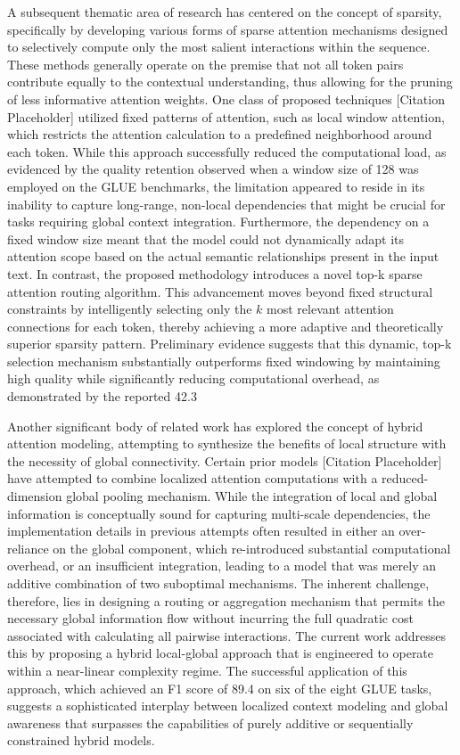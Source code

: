 \documentclass[12pt]{article}
\begin{document}
A subsequent thematic area of research has centered on the concept of sparsity, specifically by developing various forms of sparse attention mechanisms designed to selectively compute only the most salient interactions within the sequence. These methods generally operate on the premise that not all token pairs contribute equally to the contextual understanding, thus allowing for the pruning of less informative attention weights. One class of proposed techniques [Citation Placeholder] utilized fixed patterns of attention, such as local window attention, which restricts the attention calculation to a predefined neighborhood around each token. While this approach successfully reduced the computational load, as evidenced by the quality retention observed when a window size of 128 was employed on the GLUE benchmarks, the limitation appeared to reside in its inability to capture long-range, non-local dependencies that might be crucial for tasks requiring global context integration. Furthermore, the dependency on a fixed window size meant that the model could not dynamically adapt its attention scope based on the actual semantic relationships present in the input text. In contrast, the proposed methodology introduces a novel top-k sparse attention routing algorithm. This advancement moves beyond fixed structural constraints by intelligently selecting only the $k$ most relevant attention connections for each token, thereby achieving a more adaptive and theoretically superior sparsity pattern. Preliminary evidence suggests that this dynamic, top-k selection mechanism substantially outperforms fixed windowing by maintaining high quality while significantly reducing computational overhead, as demonstrated by the reported 42.3%

Another significant body of related work has explored the concept of hybrid attention modeling, attempting to synthesize the benefits of local structure with the necessity of global connectivity. Certain prior models [Citation Placeholder] have attempted to combine localized attention computations with a reduced-dimension global pooling mechanism. While the integration of local and global information is conceptually sound for capturing multi-scale dependencies, the implementation details in previous attempts often resulted in either an over-reliance on the global component, which re-introduced substantial computational overhead, or an insufficient integration, leading to a model that was merely an additive combination of two suboptimal mechanisms. The inherent challenge, therefore, lies in designing a routing or aggregation mechanism that permits the necessary global information flow without incurring the full quadratic cost associated with calculating all pairwise interactions. The current work addresses this by proposing a hybrid local-global approach that is engineered to operate within a near-linear complexity regime. The successful application of this approach, which achieved an F1 score of 89.4 on six of the eight GLUE tasks, suggests a sophisticated interplay between localized context modeling and global awareness that surpasses the capabilities of purely additive or sequentially constrained hybrid models.
\end{document}
